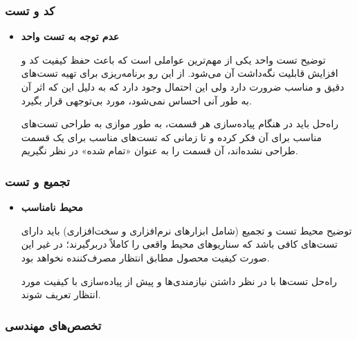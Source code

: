 \subsubsection{کد و تست}

\begin{itemize}
	
	\item 
	\textbf{عدم توجه به تست واحد}
	
	توضیح \hspace*{1cm} 
تست واحد یکی از مهم‌ترین عواملی است که باعث حفظ کیفیت کد و افزایش قابلیت نگه‌داشت آن می‌شود. از این رو برنامه‌ریزی برای تهیه تست‌های دقیق و مناسب ضرورت دارد ولی این احتمال وجود دارد که به دلیل این که اثر آن به طور آنی احساس نمی‌شود، مورد بی‌توجهی قرار بگیرد.
	
	راه‌حل \hspace*{1cm} 
باید در هنگام پیاده‌سازی هر قسمت، به طور موازی به طراحی تست‌های مناسب برای آن فکر کرده و تا زمانی که تست‌های مناسب برای یک قسمت طراحی نشده‌اند، آن قسمت را به عنوان «تمام شده»‌ در نظر نگیریم.
	
\end{itemize}

\subsubsection{تجمیع و تست}

\begin{itemize}
	
	\item 
	\textbf{محیط نامناسب}

	توضیح \hspace*{1cm} 
محیط تست و تجمیع (شامل ابزارهای نرم‌افزاری و سخت‌افزاری) باید دارای تست‌های کافی باشد که سناریوهای محیط واقعی را کاملاً دربرگیرند؛ در غیر این صورت کیفیت محصول مطابق انتظار مصرف‌کننده نخواهد بود.
	
	راه‌حل \hspace*{1cm} 
تست‌ها با در نظر داشتن نیازمندی‌ها و پیش از پیاده‌سازی با کیفیت مورد انتظار تعریف شوند.
		
\end{itemize}

\subsubsection{تخصص‌های مهندسی}

